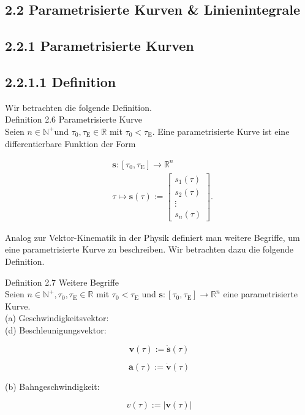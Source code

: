 \documentclass[10pt]{article}
\begin{document}
\subsection*{2.2 Parametrisierte Kurven \& Linienintegrale}
\subsection*{2.2.1 Parametrisierte Kurven}
\subsection*{2.2.1.1 Definition}
Wir betrachten die folgende Definition.\\
Definition 2.6 Parametrisierte Kurve\\
Seien $n \in \mathbb{N}^{+}$und $\tau_{0}, \tau_{\mathrm{E}} \in \mathbb{R}$ mit $\tau_{0}<\tau_{\mathrm{E}}$. Eine parametrisierte Kurve ist eine differentierbare Funktion der Form


\begin{align*}
& \mathbf{s}:\left[\tau_{0}, \tau_{\mathrm{E}}\right] \rightarrow \mathbb{R}^{n} \\
& \tau \mapsto \mathbf{s}(\tau):=\left[\begin{array}{c}
s_{1}(\tau) \\
s_{2}(\tau) \\
\vdots \\
s_{n}(\tau)
\end{array}\right] . \tag{2.36}
\end{align*}


Analog zur Vektor-Kinematik in der Physik definiert man weitere Begriffe, um eine parametrisierte Kurve zu beschreiben. Wir betrachten dazu die folgende Definition.

Definition 2.7 Weitere Begriffe\\
Seien $n \in \mathbb{N}^{+}, \tau_{0}, \tau_{\mathrm{E}} \in \mathbb{R}$ mit $\tau_{0}<\tau_{\mathrm{E}}$ und $\mathbf{s}:\left[\tau_{0}, \tau_{\mathrm{E}}\right] \rightarrow \mathbb{R}^{n}$ eine parametrisierte Kurve.\\
(a) Geschwindigkeitsvektor:\\
(d) Beschleunigungsvektor:

$$
\mathbf{v}(\tau):=\dot{\mathbf{s}}(\tau)
$$

$$
\mathbf{a}(\tau):=\dot{\mathbf{v}}(\tau)
$$

(b) Bahngeschwindigkeit:

$$
v(\tau):=|\mathbf{v}(\tau)|
$$
\end{document}
